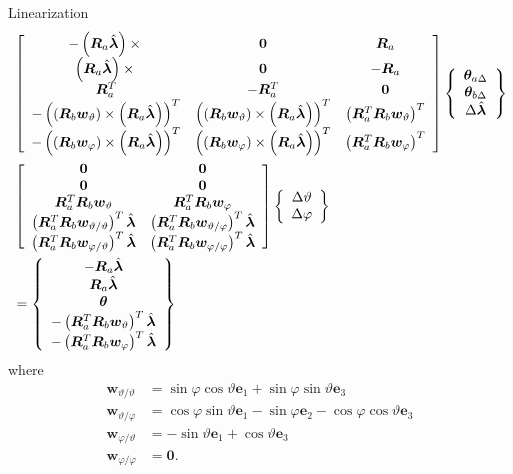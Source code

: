 \documentclass[10pt,dvips,fleqn,subeqn]{report}
\newcommand{\T}[1]{\bm{#1}}
\begin{document}
Linearization
\begin{align}
	& \sqbr{\matr{ccc}{
		-\plbr{\T{R}_a \hat{\T{\lambda}}}\times{} & \T{0} & \T{R}_a \\
%
		\plbr{\T{R}_a \hat{\T{\lambda}}}\times{} & \T{0} & -\T{R}_a \\
%
		\T{R}_a^T & -\T{R}_a^T & \T{0} \\
%
		- \plbr{\plbr{\T{R}_b \T{w}_{\vartheta}}\times\plbr{\T{R}_a \hat{\T{\lambda}}}}^T
			& \plbr{\plbr{\T{R}_b \T{w}_{\vartheta}}\times\plbr{\T{R}_a \hat{\T{\lambda}}}}^T
			& \plbr{\T{R}_a^T \T{R}_b \T{w}_{\vartheta}}^T \\
%
		- \plbr{\plbr{\T{R}_b \T{w}_{\varphi}}\times\plbr{\T{R}_a \hat{\T{\lambda}}}}^T
			& \plbr{\plbr{\T{R}_b \T{w}_{\varphi}}\times\plbr{\T{R}_a \hat{\T{\lambda}}}}^T
			& \plbr{\T{R}_a^T \T{R}_b \T{w}_{\varphi}}^T
	}} \cubr{\cvvect{
		\T{\theta}_{a\Delta} \\
		\T{\theta}_{b\Delta} \\
		\Delta\hat{\T{\lambda}} \\
	}} \nonumber \\
	& \sqbr{\matr{cc}{
		\T{0} & \T{0} \\
%
		\T{0} & \T{0} \\
%
		\T{R}_a^T \T{R}_b \T{w}_{\vartheta}
			& \T{R}_a^T \T{R}_b \T{w}_{\varphi} \\
%
		\plbr{\T{R}_a^T \T{R}_b \T{w}_{\vartheta/\vartheta}}^T \hat{\T{\lambda}}
		& \plbr{\T{R}_a^T \T{R}_b \T{w}_{\vartheta/\varphi}}^T \hat{\T{\lambda}} \\
%
		\plbr{\T{R}_a^T \T{R}_b \T{w}_{\varphi/\vartheta}}^T \hat{\T{\lambda}}
		& \plbr{\T{R}_a^T \T{R}_b \T{w}_{\varphi/\varphi}}^T \hat{\T{\lambda}}
	}} \cubr{\cvvect{
		\Delta\vartheta \\
		\Delta\varphi
	}} \nonumber \\
	&= \cubr{\cvvect{
		-\T{R}_a \hat{\T{\lambda}} \\
		\T{R}_a \hat{\T{\lambda}} \\
		\T{\theta} \\
		- \plbr{\T{R}_a^T \T{R}_b \T{w}_{\vartheta}}^T \hat{\T{\lambda}} \\
		- \plbr{\T{R}_a^T \T{R}_b \T{w}_{\varphi}}^T \hat{\T{\lambda}}
	}}
\end{align}
where
\begin{subequations}
\begin{align}
	\T{w}_{\vartheta/\vartheta}
	&= \sin\varphi \cos\vartheta \T{e}_1
	+ \sin\varphi \sin\vartheta \T{e}_3 \\
	\T{w}_{\vartheta/\varphi}
	&= \cos\varphi \sin\vartheta \T{e}_1
	- \sin\varphi \T{e}_2
	- \cos\varphi \cos\vartheta \T{e}_3 \\
	\T{w}_{\varphi/\vartheta}
	&= - \sin\vartheta \T{e}_1 + \cos\vartheta \T{e}_3 \\
	\T{w}_{\varphi/\varphi}
	&= \T{0} .
\end{align}
\end{subequations}
\end{document}
